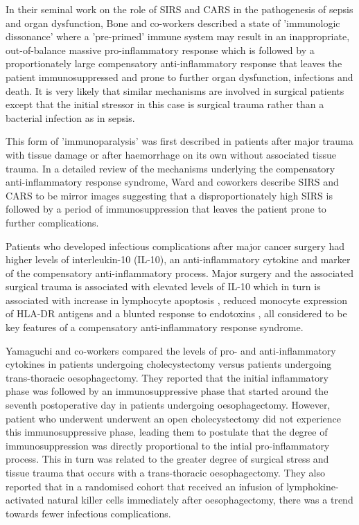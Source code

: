 In their seminal work on the role of SIRS and CARS in the pathogenesis of sepsis and organ dysfunction, Bone and co-workers described a state of 'immunologic dissonance' where a 'pre-primed' immune system may result in an inappropriate, out-of-balance massive pro-inflammatory response which is followed by a proportionately large compensatory anti-inflammatory response that leaves the patient immunosuppressed and prone to further organ dysfunction, infections and death. \parencite{bone_sepsis:_1997, bone_immunologic_1996} It is very likely that similar mechanisms are involved in surgical patients except that the initial stressor in this case is surgical trauma rather than a bacterial infection as in sepsis. 

This form of 'immunoparalysis' was first described in patients after major trauma with tissue damage \parencite{abraham_effects_1985,bandyopadhyay_negative_2007} or after haemorrhage on its own without associated tissue trauma. \parencite{stephan_hemorrhage_1987} In a detailed review of the mechanisms underlying the compensatory anti-inflammatory response syndrome, Ward and coworkers describe SIRS and CARS to be mirror images suggesting that a disproportionately high SIRS is followed by a period of immunosuppression that leaves the patient prone to further complications.\parencite{ward_compensatory_2008}

Patients who developed infectious complications after major cancer surgery had higher levels of interleukin-10 (IL-10), an anti-inflammatory cytokine and marker of the compensatory anti-inflammatory process.\parencite{mokart_early_2002} Major surgery and the associated surgical trauma is associated with elevated levels of IL-10 which in turn is associated with increase in lymphocyte apoptosis \parencite{delogu_interleukin-10_2001}, reduced monocyte expression of HLA-DR antigens \parencite{klava_interleukin-10._1997} and a blunted response to endotoxins \parencite{ogata_role_2000, kawasaki_surgical_2001}, all considered to be key features of a compensatory anti-inflammatory response syndrome. 

Yamaguchi and co-workers compared the levels of pro- and anti-inflammatory cytokines in patients undergoing cholecystectomy versus patients undergoing trans-thoracic oesophagectomy. They reported that the initial inflammatory phase was followed by an immunosuppressive phase that started around the seventh postoperative day in patients undergoing oesophagectomy. However, patient who underwent underwent an open cholecystectomy did not experience this immunosuppressive phase, leading them to postulate that the degree of immunosuppression was directly proportional to the intial pro-inflammatory process. This in turn was related to the greater degree of surgical stress and tissue trauma that occurs with a trans-thoracic oesophagectomy. They also reported that in a randomised cohort that received an infusion of lymphokine-activated natural killer cells immediately after oesophagectomy, there was a trend towards fewer infectious complications.\parencite{yamaguchi_postoperative_2006}

